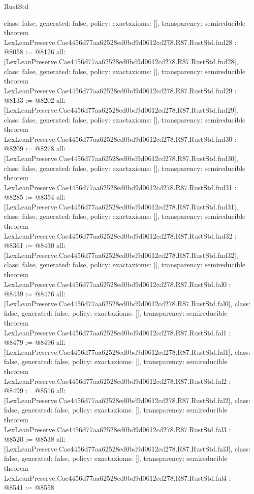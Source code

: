 \begin{lexlean}{RustStd}
\begin{coremodule}
{  class: false,
  generated: false,
  policy: exact{axioms: []},
  transparency: semireducible
}
theorem LexLeanPreserve.Cae4456d77aa62528ed0bd9d0612cd278.R87.RustStd.fnd28 : @8058 := @8126 {
  all: [LexLeanPreserve.Cae4456d77aa62528ed0bd9d0612cd278.R87.RustStd.fnd28],
  class: false,
  generated: false,
  policy: exact{axioms: []},
  transparency: semireducible
}
theorem LexLeanPreserve.Cae4456d77aa62528ed0bd9d0612cd278.R87.RustStd.fnd29 : @8133 := @8202 {
  all: [LexLeanPreserve.Cae4456d77aa62528ed0bd9d0612cd278.R87.RustStd.fnd29],
  class: false,
  generated: false,
  policy: exact{axioms: []},
  transparency: semireducible
}
theorem LexLeanPreserve.Cae4456d77aa62528ed0bd9d0612cd278.R87.RustStd.fnd30 : @8209 := @8278 {
  all: [LexLeanPreserve.Cae4456d77aa62528ed0bd9d0612cd278.R87.RustStd.fnd30],
  class: false,
  generated: false,
  policy: exact{axioms: []},
  transparency: semireducible
}
theorem LexLeanPreserve.Cae4456d77aa62528ed0bd9d0612cd278.R87.RustStd.fnd31 : @8285 := @8354 {
  all: [LexLeanPreserve.Cae4456d77aa62528ed0bd9d0612cd278.R87.RustStd.fnd31],
  class: false,
  generated: false,
  policy: exact{axioms: []},
  transparency: semireducible
}
theorem LexLeanPreserve.Cae4456d77aa62528ed0bd9d0612cd278.R87.RustStd.fnd32 : @8361 := @8430 {
  all: [LexLeanPreserve.Cae4456d77aa62528ed0bd9d0612cd278.R87.RustStd.fnd32],
  class: false,
  generated: false,
  policy: exact{axioms: []},
  transparency: semireducible
}
theorem LexLeanPreserve.Cae4456d77aa62528ed0bd9d0612cd278.R87.RustStd.fal0 : @8439 := @8476 {
  all: [LexLeanPreserve.Cae4456d77aa62528ed0bd9d0612cd278.R87.RustStd.fal0],
  class: false,
  generated: false,
  policy: exact{axioms: []},
  transparency: semireducible
}
theorem LexLeanPreserve.Cae4456d77aa62528ed0bd9d0612cd278.R87.RustStd.fal1 : @8479 := @8496 {
  all: [LexLeanPreserve.Cae4456d77aa62528ed0bd9d0612cd278.R87.RustStd.fal1],
  class: false,
  generated: false,
  policy: exact{axioms: []},
  transparency: semireducible
}
theorem LexLeanPreserve.Cae4456d77aa62528ed0bd9d0612cd278.R87.RustStd.fal2 : @8499 := @8516 {
  all: [LexLeanPreserve.Cae4456d77aa62528ed0bd9d0612cd278.R87.RustStd.fal2],
  class: false,
  generated: false,
  policy: exact{axioms: []},
  transparency: semireducible
}
theorem LexLeanPreserve.Cae4456d77aa62528ed0bd9d0612cd278.R87.RustStd.fal3 : @8520 := @8538 {
  all: [LexLeanPreserve.Cae4456d77aa62528ed0bd9d0612cd278.R87.RustStd.fal3],
  class: false,
  generated: false,
  policy: exact{axioms: []},
  transparency: semireducible
}
theorem LexLeanPreserve.Cae4456d77aa62528ed0bd9d0612cd278.R87.RustStd.fal4 : @8541 := @8558 {
}
\end{coremodule}
\end{lexlean}
